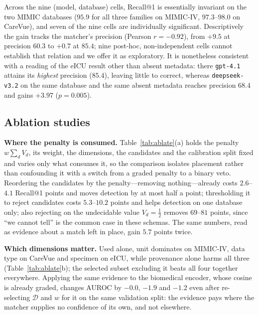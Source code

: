 Across the nine (model, database) cells, Recall@1 is essentially invariant on the two
MIMIC databases ($95.9$ for all three families on MIMIC-IV, $97.3$--$98.0$ on CareVue),
and seven of the nine cells are individually significant. Descriptively the gain tracks
the matcher's precision (Pearson $r{=}-0.92$), from $+9.5$ at precision $60.3$ to $+0.7$
at $85.4$; nine post-hoc, non-independent cells cannot establish that relation and we
offer it as exploratory. It is nonetheless consistent with a reading of the eICU result
other than absent metadata: there \texttt{gpt-4.1} attains its \emph{highest} precision
($85.4$), leaving little to correct, whereas \texttt{deepseek-v3.2} on the same database
and the same absent metadata reaches precision $68.4$ and gains $+3.97$ ($p{=}0.005$).

\subsection{Ablation studies}
\label{sec:ablation}



\noindent\textbf{Where the penalty is consumed.}
Table~\ref{tab:ablate}(a) holds the penalty $w\sum_d V_d$, its weight, the dimensions,
the candidates and the calibration split fixed and varies only what consumes it, so the
comparison isolates placement rather than confounding it with a switch from a graded
penalty to a binary veto. Reordering the candidates by the penalty---removing
nothing---already costs $2.6$--$4.1$ Recall@1 points and moves detection by at most half a
point; thresholding it to reject candidates costs $5.3$--$10.2$ points and helps detection
on one database only; also rejecting on the undecidable value $V_d{=}\tfrac12$ removes
$69$--$81$ points, since ``we cannot tell'' is the common case in these schemas. The same
numbers, read as evidence about a match left in place, gain $5.7$ points twice.

\noindent\textbf{Which dimensions matter.}
Used alone, unit dominates on MIMIC-IV, data type on CareVue and specimen on eICU, while
provenance alone harms all three (Table~\ref{tab:ablate}b); the selected subset excluding
it beats all four together everywhere. Applying the same evidence to the biomedical
encoder, whose cosine is already graded, changes AUROC by $-0.0$, $-1.9$ and $-1.2$ even
after re-selecting $\mathcal{D}$ and $w$ for it on the same validation split: the evidence
pays where the matcher supplies no confidence of its own, and not elsewhere.

